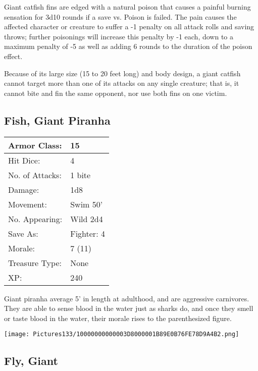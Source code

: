 \documentclass[a4paper,twoside,openany,10pt]{book}
\begin{document}
\begin{multicols}{2}
Giant catfish fins are edged with a natural poison that causes a painful burning sensation for 3d10 rounds if a save vs. Poison is failed. The pain causes the affected character or creature to suffer a -1 penalty on all attack rolls and saving throws; further poisonings will increase this penalty by -1 each, down to a maximum penalty of -5 as well as adding 6 rounds to the duration of the poison effect.

Because of its large size (15 to 20 feet long) and body design, a giant catfish cannot target more than one of its attacks on any single creature; that is, it cannot bite and fin the same opponent, nor use both fins on one victim.

\subsection*{Fish, Giant Piranha}\label{fish-giant-piranha}

\begin{tabularx}{0.48\textwidth}{@{}lX@{}}
Armor Class: & 15 \\\hline
Hit Dice: & 4 \\\hline
No. of Attacks: & 1 bite \\\hline
Damage: & 1d8 \\\hline
Movement: & Swim 50' \\\hline
No. Appearing: & Wild 2d4 \\\hline
Save As: & Fighter: 4 \\\hline
Morale: & 7 (11) \\\hline
Treasure Type: & None \\\hline
XP: & 240 \\\hline
\end{tabularx}\medskip


Giant piranha average 5' in length at adulthood, and are aggressive carnivores. They are able to sense blood in the water just as sharks do, and once they smell or taste blood in the water, their morale rises to the parenthesized figure.

\begin{center}
	\texttt{[image: Pictures133/10000000000003D8000001B89E0B76FE78D9A4B2.png]}
\end{center}

\subsection*{Fly, Giant}\label{fly-giant}


\end{multicols}
\end{document}
